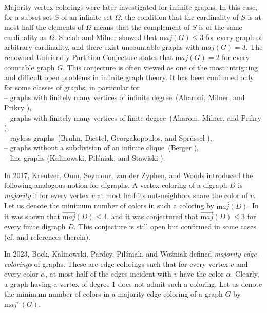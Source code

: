 \documentclass[11pt]{article}
\begin{document}
Majority vertex-colorings were later investigated for infinite graphs. In this case, for a subset set $S$ of an infinite set $\Omega$, the condition that the cardinality of $S$ is at most half the elements of $\Omega$  means that the complement of $S$ is of the same cardinality as $\Omega$. Shelah and Milner \cite{ShMi90} showed that ${\mathrm maj}(G)\le 3$ for every graph of arbitrary cardinality, and there exist uncountable graphs with ${\mathrm maj}(G)=3$. The renowned Unfriendly Partition Conjecture states that ${\mathrm maj}(G)=2$ for every countable graph $G$. This conjecture is often viewed as one of the most intriguing and difficult open problems in infinite graph theory. It has been confirmed only for some classes of graphs, in particular for \\ 
-- graphs with finitely many vertices of infinite degree~(Aharoni, Milner, and Prikry \cite{AMP90}),
\\ -- graphs with finitely many vertices of finite degree~(Aharoni, Milner, and Prikry \cite{AMP90}),
\\ -- rayless graphs~(Bruhn, Diestel, Georgakopoulos, and Spr\"ussel \cite{BDGS10}),
\\ -- graphs without a subdivision of an infinite clique~(Berger \cite{Ber17}),
\\ -- line graphs (Kalinowski, Pil\'sniak, and Stawiski \cite{KPS25}).

\vspace{6mm}
In 2017, Kreutzer, Oum, Seymour, van der Zyphen, and Woods \cite{KOSvW17} introduced the following analogous notion for digraphs. A vertex-coloring of a digraph $D$ is {\it majority} if for every vertex $v$ at most half its out-neighbors share the color of $v$. Let us denote the minimum number of colors in such a coloring by $\overrightarrow{{\mathrm maj}}(D)$. In \cite{KOSvW17} it was shown that $\overrightarrow{{\mathrm maj}}(D)\le 4$, and it was conjectured that $\overrightarrow{{\mathrm maj}}(D)\le 3$ for every finite digraph $D$. This conjecture is still open but confirmed in some cases (cf. \cite{ABGGPZ25} and references therein).

\vspace{6mm}

In 2023, Bock, Kalinowski, Pardey, Pil\'sniak, and Wo\'zniak \cite{BKPPRW23} defined {\it majority edge-colorings} of graphs. These are edge-colorings such that for every vertex $v$ and every color $\alpha$, at most half of the edges incident with $v$ have the color $\alpha$. Clearly, a graph having a vertex of degree 1 does not admit such a coloring. Let us denote the minimum number of colors in a majority edge-coloring of a graph $G$ by ${\mathrm maj'\,}(G)$. 
\end{document}

